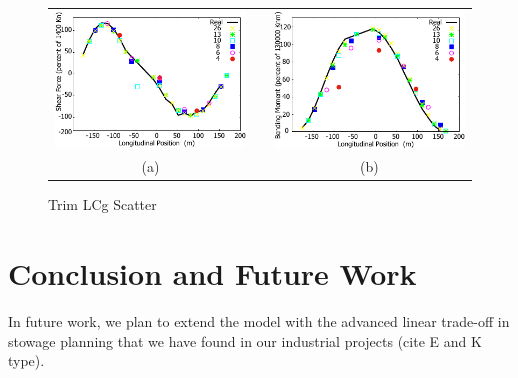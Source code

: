 \documentclass[runningheads]{llncs}
\begin{document}
 
\begin{figure}[h!]
\begin{center}
 \begin{tabular}{ccc}
  \includegraphics[scale=1]{figures/ShearForceplot} & & \includegraphics[scale=1]{figures/BendingMomentplot} \\
  (a) & \hspace{5mm} & (b)
\end{tabular}  
\end{center}
\caption{Trim LCg Scatter}
\label{fig:trimlcgscatter}
\end{figure}
 
 
 
 
 
\section{Conclusion and Future Work}

 In future work, we plan to extend the model with the advanced linear trade-off in stowage planning that we have found in our  industrial projects (cite E and K type).    



\end{document}
